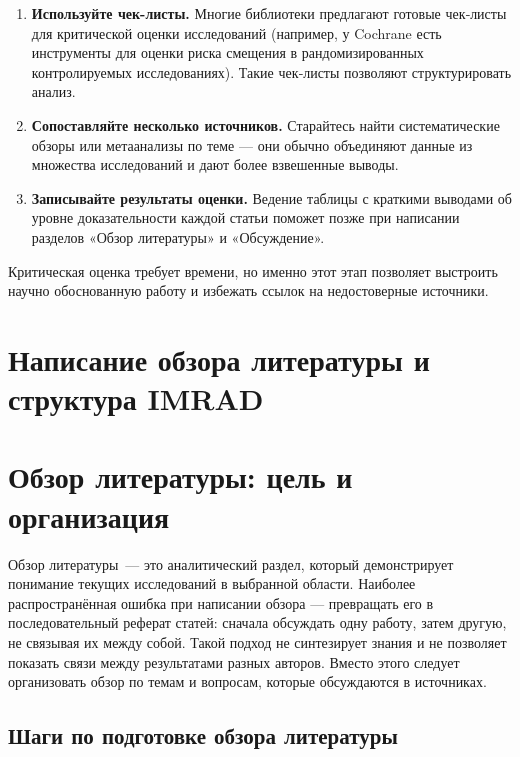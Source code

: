 \documentclass[
  russian,
  12pt,
  a4paper,
]{article}
\providecommand{\tightlist}{%
  \setlength{\itemsep}{0pt}\setlength{\parskip}{0pt}}
\begin{document}
\begin{enumerate}
\def\labelenumi{\arabic{enumi}.}
\tightlist
\item
  \textbf{Используйте чек-листы.} Многие библиотеки предлагают готовые
  чек‑листы для критической оценки исследований (например, у Cochrane
  есть инструменты для оценки риска смещения в рандомизированных
  контролируемых исследованиях). Такие чек‑листы позволяют
  структурировать анализ.
\item
  \textbf{Сопоставляйте несколько источников.} Старайтесь найти
  систематические обзоры или метаанализы по теме --- они обычно
  объединяют данные из множества исследований и дают более взвешенные
  выводы.
\item
  \textbf{Записывайте результаты оценки.} Ведение таблицы с краткими
  выводами об уровне доказательности каждой статьи поможет позже при
  написании разделов «Обзор литературы» и «Обсуждение».
\end{enumerate}

Критическая оценка требует времени, но именно этот этап позволяет
выстроить научно обоснованную работу и избежать ссылок на недостоверные
источники.

\chapter{Написание обзора литературы и структура
IMRAD}\label{ux43dux430ux43fux438ux441ux430ux43dux438ux435-ux43eux431ux437ux43eux440ux430-ux43bux438ux442ux435ux440ux430ux442ux443ux440ux44b-ux438-ux441ux442ux440ux443ux43aux442ux443ux440ux430-imrad}

\chapter{Обзор литературы: цель и
организация}\label{sec-literature_review}

Обзор литературы~--- это аналитический раздел, который демонстрирует
понимание текущих исследований в выбранной области. Наиболее
распространённая ошибка при написании обзора --- превращать его в
последовательный реферат статей: сначала обсуждать одну работу, затем
другую, не связывая их между собой. Такой подход не синтезирует знания и
не позволяет показать связи между результатами разных авторов. Вместо
этого следует организовать обзор по темам и вопросам, которые
обсуждаются в источниках.

\section{Шаги по подготовке обзора
литературы}\label{ux448ux430ux433ux438-ux43fux43e-ux43fux43eux434ux433ux43eux442ux43eux432ux43aux435-ux43eux431ux437ux43eux440ux430-ux43bux438ux442ux435ux440ux430ux442ux443ux440ux44b}
\end{document}
